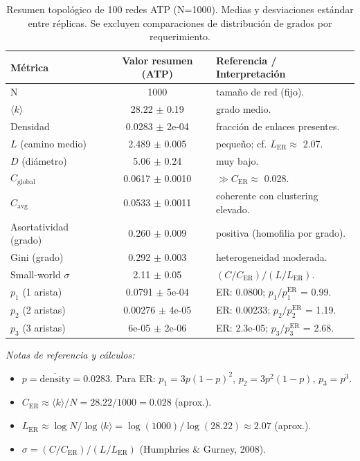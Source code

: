 \documentclass[11pt]{article}
\begin{document}
\begin{table}[ht]
\centering
\caption{Resumen topológico de 100 redes ATP (N=1000). Medias y desviaciones estándar entre réplicas. Se excluyen comparaciones de distribución de grados por requerimiento.}
\vspace{0.5em}
\begin{tabular}{l@{\hspace{1em}}c@{\hspace{3em}}l}
\toprule
\textbf{Métrica} & \textbf{Valor resumen (ATP)} & \textbf{Referencia / Interpretación} \\
\midrule
N & 1000 & tamaño de red (fijo). \\
$\langle k \rangle$ & 28.22 $\pm$ 0.19 & grado medio. \\
Densidad & 0.0283 $\pm$ 2e-04 & fracción de enlaces presentes. \\
$L$ (camino medio) & 2.489 $\pm$ 0.005 & pequeño; cf. $L_{\mathrm{ER}}\approx$ 2.07. \\
$D$ (diámetro) & 5.06 $\pm$ 0.24 & muy bajo. \\
$C_{\mathrm{global}}$ & 0.0617 $\pm$ 0.0010 & $\gg C_{\mathrm{ER}}\approx$ 0.028. \\
$C_{\mathrm{avg}}$ & 0.0533 $\pm$ 0.0011 & coherente con clustering elevado. \\
Asortatividad (grado) & 0.260 $\pm$ 0.009 & positiva (homofilia por grado). \\
Gini (grado) & 0.292 $\pm$ 0.003 & heterogeneidad moderada. \\
Small-world $\sigma$ & 2.11 $\pm$ 0.05 & $(C/C_{\mathrm{ER}})/(L/L_{\mathrm{ER}})$. \\
\midrule
$p_1$ (1 arista) & 0.0791 $\pm$ 5e-04 & ER: 0.0800; $p_1/p_1^{\mathrm{ER}}$ = 0.99. \\
$p_2$ (2 aristas) & 0.00276 $\pm$ 4e-05 & ER: 0.00233; $p_2/p_2^{\mathrm{ER}}$ = 1.19. \\
$p_3$ (3 aristas) & 6e-05 $\pm$ 2e-06 & ER: 2.3e-05; $p_3/p_3^{\mathrm{ER}}$ = 2.68. \\
\bottomrule
\end{tabular}
\vspace{0.75em}
\captionsetup{justification=raggedright,singlelinecheck=false}
\small \textit{Notas de referencia y cálculos:}
\begin{itemize}
\item $p=\overline{\text{density}}= 0.0283$. Para ER: $p_1=3p(1-p)^2$, $p_2=3p^2(1-p)$, $p_3=p^3$.
\item $C_{\mathrm{ER}}\approx \langle k \rangle/N = 28.22 / 1000 = 0.028$ (aprox.).
\item $L_{\mathrm{ER}}\approx \log N / \log \langle k \rangle = \log(1000)/\log(28.22) \approx 2.07$ (aprox.).
\item $\sigma = (C/C_{\mathrm{ER}})/(L/L_{\mathrm{ER}})$ (Humphries \& Gurney, 2008).
\end{itemize}
\end{table}
\end{document}
